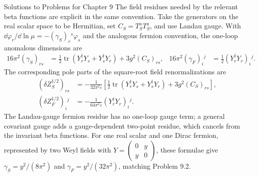 \begin{bankssolutions}{Solutions to Problems for Chapter 9}
The field residues needed by the relevant beta functions are explicit in the
same convention.  Take the generators on the real scalar space to be
Hermitian, set $C_S=T_S^aT_S^a$, and use Landau gauge.  With
$\dd\varphi_r/\dd\ln\mu=-(\gamma_S)_r{}^s\varphi_s$ and the analogous
fermion convention, the one-loop anomalous dimensions are
\begin{align}
 16\pi^2(\gamma_S)_{rs}&=\frac12\operatorname{tr}
 (Y_r^\dagger Y_s+Y_s^\dagger Y_r)+3g^2(C_S)_{rs},
 &16\pi^2(\gamma_F)_i{}^j&=\frac12(Y_r^\dagger Y_r)_i{}^j.
 \label{eq:9.6-sol-gammas}
\end{align}
The corresponding pole parts of the square-root field renormalizations are
\begin{align*}
 (\delta Z_S^{1/2})_{rs}&=-\frac{1}{32\pi^2\varepsilon}
 \left[\frac12\operatorname{tr}(Y_r^\dagger Y_s+Y_s^\dagger Y_r)
       +3g^2(C_S)_{rs}\right],\\
 (\delta Z_F^{1/2})_i{}^j&=-\frac{1}{64\pi^2\varepsilon}
 (Y_r^\dagger Y_r)_i{}^j.
\end{align*}
The Landau-gauge fermion residue has no one-loop gauge term; a general
covariant gauge adds a gauge-dependent two-point residue, which cancels from
the invariant beta functions.  For one real scalar and one Dirac fermion,
represented by two Weyl fields with
$Y=\left(\begin{smallmatrix}0&y\\y&0\end{smallmatrix}\right)$, these
formulae give $\gamma_S=y^2/(8\pi^2)$ and
$\gamma_F=y^2/(32\pi^2)$, matching Problem 9.2.


\end{bankssolutions}
